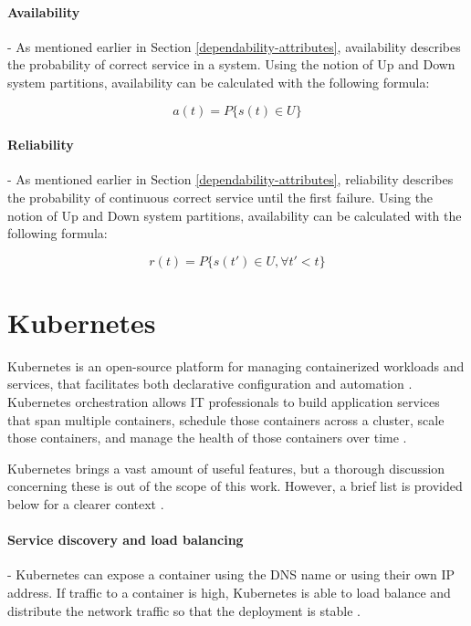 \paragraph{Availability} - As mentioned earlier in Section \ref{dependability-attributes}, availability describes the probability of correct service in a system. Using the notion of Up and Down system partitions, availability can be calculated with the following formula:

\[
a(t) = P\{ s(t) \in U \}
\]

\paragraph{Reliability} - As mentioned earlier in Section \ref{dependability-attributes}, reliability describes the probability of continuous correct service until the first failure. Using the notion of Up and Down system partitions, availability can be calculated with the following formula:

\[
r(t) = P\{ s(t') \in U, \forall t' < t \}
\]


\section{Kubernetes}

Kubernetes is an open-source platform for managing containerized workloads and services, that facilitates both declarative configuration and automation \cite{KubernetesOverview}. Kubernetes orchestration allows IT professionals to build application services that span multiple containers, schedule those containers across a cluster, scale those containers, and manage the health of those containers over time \cite{KubernetesOverviewRH}.

Kubernetes brings a vast amount of useful features, but a thorough discussion concerning these is out of the scope of this work. However, a brief list is provided below for a clearer context \cite{KubernetesOverview}.

\paragraph{Service discovery and load balancing} - Kubernetes can expose a container using the DNS name or using their own IP address. If traffic to a container is high, Kubernetes is able to load balance and distribute the network traffic so that the deployment is stable \cite{KubernetesOverview}.

